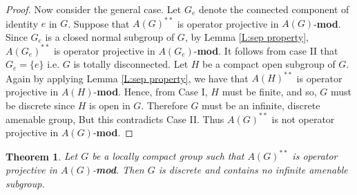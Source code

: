 \documentclass[10pt]{amsart}
\newtheorem{thm}{Theorem}
\numberwithin{thm}{section}
\numberwithin{equation}{section}
\begin{document}
\begin{proof}
Now consider the general case. Let $G_e$ denote the connected component of identity $e$ in $G$.
Suppose that $A(G)^{**}$ is operator projective in $A(G)$-{\textbf{mod}}. Since $G_e$ is a closed normal subgroup 
of $G$, by Lemma \ref{L:sep property}, $A(G_e)^{**}$ is operator projective in $A(G_e)$-{\textbf{mod}}.
It follows from case II that $G_e=\{ e \}$ i.e. $G$ is totally disconnected. Let $H$ be a compact open
subgroup of $G$. Again by applying Lemma \ref{L:sep property}, we have that $A(H)^{**}$ is 
operator projective in $A(H)$-{\textbf{mod}}. Hence, from Case I, $H$ must be finite, and so, $G$ must be discrete
since $H$ is open in $G$. Therefore $G$ must be an infinite, discrete amenable group, But this 
contradicts Case II. Thus $A(G)^{**}$ is not operator projective in $A(G)$-{\textbf{mod}}. 

\end{proof}

\begin{thm}\label{T:proj-second dual}
Let $G$ be a locally compact group such that $A(G)^{**}$ is operator projective in $A(G)$-{\textbf{mod}}.
Then $G$ is discrete and contains no infinite amenable subgroup.
\end{thm}
\end{document}

